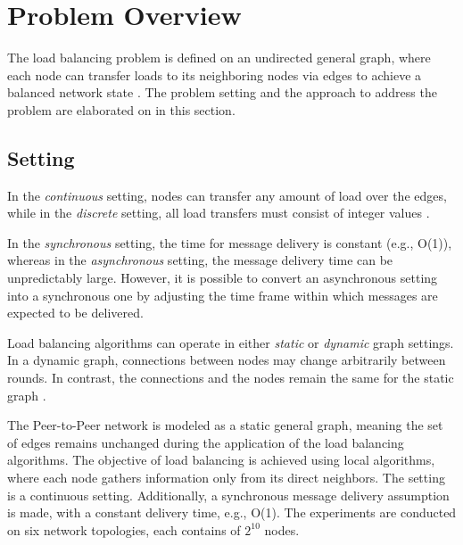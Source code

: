 \chapter{Problem Overview}\label{chap:problemoverview}
The load balancing problem is defined on an undirected general graph, where each node can transfer loads to its neighboring nodes via edges to achieve a balanced network state \cite{Dinitz2023DAB}. The problem setting and the approach to address the problem are elaborated on in this section.

\section{Setting}\label{sec:setting}
\begin{definition}
    In the \textit{continuous} setting, nodes can transfer any amount of load over the edges, while in the \textit{discrete} setting, all load transfers must consist of integer values \cite{Dinitz2023DAB}.
\end{definition}

\begin{definition}
    In the \textit{synchronous} setting, the time for message delivery is constant (e.g., O(1)), whereas in the \textit{asynchronous} setting, the message delivery time can be unpredictably large. However, it is possible to convert an asynchronous setting into a synchronous one by adjusting the time frame within which messages are expected to be delivered. \cite{Dinitz2023DAB}
\end{definition}

\begin{definition}
    Load balancing algorithms can operate in either \textit{static} or \textit{dynamic} graph settings. In a dynamic graph, connections between nodes may change arbitrarily between rounds. In contrast, the connections and the nodes remain the same for the static graph \cite{Dinitz2023DAB}.
\end{definition}

The Peer-to-Peer network is modeled as a static general graph, meaning the set of edges remains unchanged during the application of the load balancing algorithms. The objective of load balancing is achieved using local algorithms, where each node gathers information only from its direct neighbors. The setting is a continuous setting. Additionally, a synchronous message delivery assumption is made, with a constant delivery time, e.g., O(1). The experiments are conducted on six network topologies, each contains of $2^{10}$ nodes.

